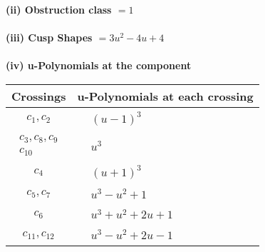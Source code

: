 \documentclass[1p]{elsarticle_modified}
\theoremstyle{definition}
\begin{document}
\flushleft \textbf{(ii) Obstruction class $= 1$}\\~\\
\flushleft \textbf{(iii) Cusp Shapes $= 3 u^2-4 u+4$}\\~\\
\newpage\renewcommand{\arraystretch}{1}
\flushleft \textbf{(iv) u-Polynomials at the component}\newline \\
\begin{tabular}{m{50pt}|m{274pt}}
Crossings & \hspace{64pt}u-Polynomials at each crossing \\
\hline $$\begin{aligned}c_{1},c_{2}\end{aligned}$$&$\begin{aligned}
&(u-1)^3
\end{aligned}$\\
\hline $$\begin{aligned}c_{3},c_{8},c_{9}\\c_{10}\end{aligned}$$&$\begin{aligned}
&u^3
\end{aligned}$\\
\hline $$\begin{aligned}c_{4}\end{aligned}$$&$\begin{aligned}
&(u+1)^3
\end{aligned}$\\
\hline $$\begin{aligned}c_{5},c_{7}\end{aligned}$$&$\begin{aligned}
&u^3- u^2+1
\end{aligned}$\\
\hline $$\begin{aligned}c_{6}\end{aligned}$$&$\begin{aligned}
&u^3+u^2+2 u+1
\end{aligned}$\\
\hline $$\begin{aligned}c_{11},c_{12}\end{aligned}$$&$\begin{aligned}
&u^3- u^2+2 u-1
\end{aligned}$\\
\hline
\end{tabular}\\~\\
\end{document}
